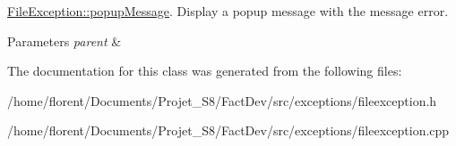 \hyperlink{classExceptions_1_1FileException_aba824967d55e0a9a29c23521d87f05dd}{File\-Exception\-::popup\-Message}. Display a popup message with the message error. 


\begin{DoxyParams}{Parameters}
{\em parent} & \\
\hline
\end{DoxyParams}


The documentation for this class was generated from the following files\-:\begin{DoxyCompactItemize}
\item 
/home/florent/\-Documents/\-Projet\-\_\-\-S8/\-Fact\-Dev/src/exceptions/fileexception.\-h\item 
/home/florent/\-Documents/\-Projet\-\_\-\-S8/\-Fact\-Dev/src/exceptions/fileexception.\-cpp\end{DoxyCompactItemize}
